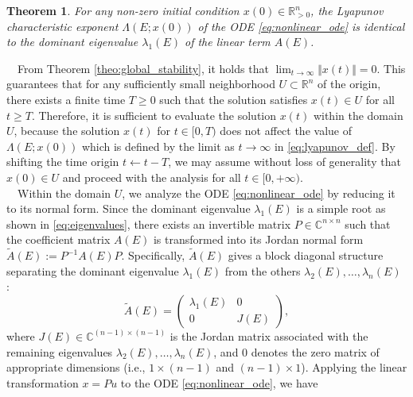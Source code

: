 \documentclass[11pt,a4paper]{article}
\newtheorem{theo}{Theorem}[section]
\begin{document}
\begin{theo}\label{theo:lyapunov_equivalence}For any non-zero initial condition $x(0) \in \mathbb{R}^n_{> 0}$, the Lyapunov characteristic exponent $\Lambda(E;x(0))$ of the ODE \eqref{eq:nonlinear_ode}  is identical to the dominant eigenvalue $\lambda_1(E)$ of the linear term $A(E)$.
\end{theo}
~~From Theorem \ref{theo:global_stability}, it holds that $\lim_{t \to \infty} \Vert{}x(t)\Vert{} = 0$. This guarantees that for any sufficiently small neighborhood $U \subset \mathbb{R}^n$ of the origin, there exists a finite time $T \ge 0$ such that the solution satisfies $x(t) \in U$ for all $t \ge T$. Therefore, it is  sufficient to evaluate the solution $x(t)$ within the domain $U$, because the solution $x(t)$ for $t \in [0, T)$ does not affect the value of $\Lambda(E;x(0))$ which is defined by the limit as $t \to \infty$ in \eqref{eq:lyapunov_def}. By shifting the time origin $t \leftarrow t - T$, we may assume without loss of generality that $x(0) \in U$ and proceed with the analysis for all $t \in [0, +\infty)$.\\
~~Within the domain $U$, we analyze the ODE \eqref{eq:nonlinear_ode} by reducing it to its normal form. Since the dominant eigenvalue $\lambda_1(E)$ is a simple root as shown in \eqref{eq:eigenvalues}, there exists an invertible matrix $P \in \mathbb{C}^{n \times n}$ such that the coefficient matrix $A(E)$ is transformed into its Jordan normal form $\tilde{A}(E) := P^{-1} A(E) P$. Specifically, $\tilde{A}(E)$ gives a block diagonal structure separating the dominant eigenvalue $\lambda_1(E)$ from the others $\lambda_2(E), \dots, \lambda_n(E)$ \cite{Mirzaev-2013,Mirzaev-2015}:
\begin{equation}
\tilde{A}(E) = \begin{pmatrix} \lambda_1(E) & 0 \\ 0 & J(E) \end{pmatrix}, \label{eq:jordan_form}
\end{equation}
where $J(E) \in \mathbb{C}^{(n-1) \times (n-1)}$ is the Jordan matrix associated with the remaining eigenvalues $\lambda_2(E), \dots, \lambda_n(E)$, and $0$ denotes the zero matrix of appropriate dimensions (i.e., $1 \times (n-1)$ and $(n-1) \times 1$).  Applying the linear transformation $x = P u$ to the ODE \eqref{eq:nonlinear_ode}, we have
\end{document}
